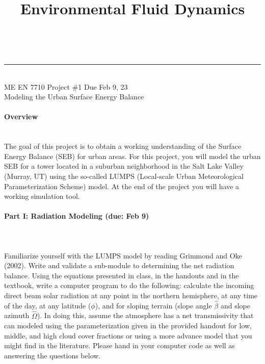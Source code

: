 \documentclass[11pt]{article}
\makeatletter
\newcommand{\linia}{\rule{\linewidth}{0.5pt}}
\renewcommand{\maketitle}{
\begin{center}
\vspace{2ex}
{\huge \textsc{\@title}}
\vspace{1ex}
\\
\linia\\
ME EN 7710 \hfill Project \#1 \hfill Due Feb 9, 23\\
Modeling the Urban Surface Energy Balance
\vspace{4ex}
\end{center}
}
\makeatother
\begin{document}

\title{Environmental Fluid Dynamics}

\maketitle
\vspace{-20pt}
\paragraph{\large Overview}~\\
The goal of this project is to obtain a working understanding of the Surface Energy Balance (SEB) for urban areas. For this project, you will model the urban SEB for a tower located in a suburban neighborhood in the Salt Lake Valley (Murray, UT) using the so-called LUMPS (Local-scale Urban Meteorological Parameterization Scheme) model. At the end of the project you will have a working simulation tool. 

\paragraph{\large Part I: Radiation Modeling (due: Feb 9)}~\\\\
Familiarize yourself with the LUMPS model by reading Grimmond and Oke (2002). Write and validate a sub-module to determining the net radiation balance. Using the equations presented in class, in the handouts and in the textbook, write a computer program to do the following: calculate the incoming direct beam solar radiation at any point in the northern hemisphere, at any time of the day, at any latitude ($\phi$), and for sloping terrain (slope angle $\hat\beta$ and slope azimuth $\hat \Omega$).  In doing this, assume the atmosphere has a net transmissivity that can modeled using the parameterization given in the provided handout for low, middle, and high cloud cover fractions or using a more advance model that you might find in the literature. Please hand in your computer code as well as answering the questions below.
\end{document}
